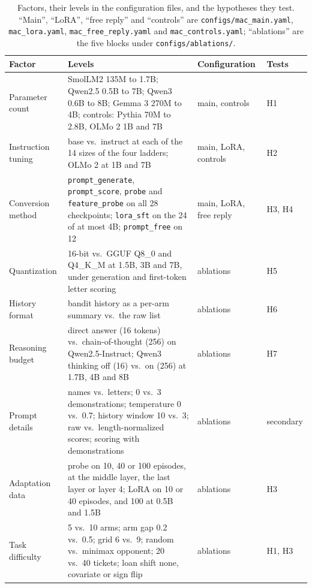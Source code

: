 \begin{table}[t]
\centering\small
\caption{Factors, their levels in the configuration files, and the hypotheses they test. ``Main'', ``LoRA'', ``free reply'' and ``controls'' are \texttt{configs/mac\_main.yaml}, \texttt{mac\_lora.yaml}, \texttt{mac\_free\_reply.yaml} and \texttt{mac\_controls.yaml}; ``ablations'' are the five blocks under \texttt{configs/ablations/}.}
\label{tab:factors}
\begin{tabularx}{\linewidth}{@{}l X l l@{}}
\toprule
Factor & Levels & Configuration & Tests\\
\midrule
Parameter count & SmolLM2 135M to 1.7B; Qwen2.5 0.5B to 7B; Qwen3 0.6B to 8B; Gemma 3 270M to 4B; controls: Pythia 70M to 2.8B, OLMo 2 1B and 7B & main, controls & H1\\
Instruction tuning & base vs.\ instruct at each of the 14 sizes of the four ladders; OLMo 2 at 1B and 7B & main, LoRA, controls & H2\\
Conversion method & \texttt{prompt\_generate}, \texttt{prompt\_score}, \texttt{probe} and \texttt{feature\_probe} on all 28 checkpoints; \texttt{lora\_sft} on the 24 of at most 4B; \texttt{prompt\_free} on 12 & main, LoRA, free reply & H3, H4\\
Quantization & 16-bit vs.\ GGUF Q8\_0 and Q4\_K\_M at 1.5B, 3B and 7B, under generation and first-token letter scoring & ablations & H5\\
History format & bandit history as a per-arm summary vs.\ the raw list & ablations & H6\\
Reasoning budget & direct answer (16 tokens) vs.\ chain-of-thought (256) on Qwen2.5-Instruct; Qwen3 thinking off (16) vs.\ on (256) at 1.7B, 4B and 8B & ablations & H7\\
Prompt details & names vs.\ letters; 0 vs.\ 3 demonstrations; temperature 0 vs.\ 0.7; history window 10 vs.\ 3; raw vs.\ length-normalized scores; scoring with demonstrations & ablations & secondary\\
Adaptation data & probe on 10, 40 or 100 episodes, at the middle layer, the last layer or layer 4; LoRA on 10 or 40 episodes, and 100 at 0.5B and 1.5B & ablations & H3\\
Task difficulty & 5 vs.\ 10 arms; arm gap 0.2 vs.\ 0.5; grid 6 vs.\ 9; random vs.\ minimax opponent; 20 vs.\ 40 tickets; loan shift none, covariate or sign flip & ablations & H1, H3\\
\bottomrule
\end{tabularx}
\end{table}

